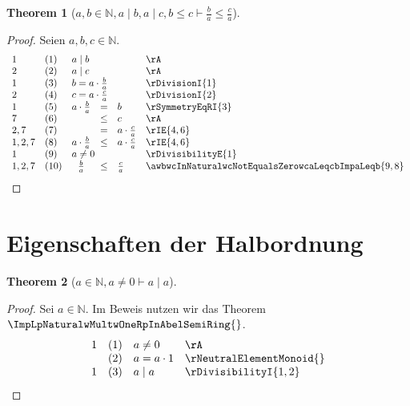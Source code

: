 \documentclass{book}
\theoremstyle{plain}
\newtheorem{theorem}{Theorem}
\theoremstyle{remark}
\theoremstyle{definition}
\begin{document}
\label{awbInNaturalwaMidbwaMidcwbLeqcImpLpbRpDurchLpaRpLeqLpcRpDurchLpaRp}
\begin{theorem}[\(a,b\in\mathbb{N}, a\mid b, a\mid c, b\leq c\vdash \frac{b}{a}\leq \frac{c}{a}\)]    
\end{theorem}
\begin{proof}
Seien \(a,b,c \in\mathbb{N}\).
    \[
	\begin{array}{llclll}
    1       &  (1)  & \multicolumn{3}{l}{a\mid b} & \rA \\
    2       &  (2)  & \multicolumn{3}{l}{a\mid c} & \rA \\
    1       &  (3)  & \multicolumn{3}{l}{b=a\cdot\frac{b}{a}} & \rDivisionI{1} \\
    2       &  (4)  & \multicolumn{3}{l}{c=a\cdot\frac{c}{a}} & \rDivisionI{2} \\
    1       &  (5)  & a\cdot \frac{b}{a}&=&b & \rSymmetryEqRI{3} \\
    7       &  (6)  & &\leq &c & \rA \\
    2,7     &  (7)  & &= &a\cdot\frac{c}{a} & \rIE{4,6} \\
    1,2,7   &  (8)  & a\cdot \frac{b}{a}&\leq  &a\cdot\frac{c}{a} & \rIE{4,6} \\
    1       &  (9)  & \multicolumn{3}{l}{a\neq 0} & \rDivisibilityE{1} \\
    1,2,7   &  (10)  & \frac{b}{a}&\leq  &\frac{c}{a} & \awbwcInNaturalwcNotEqualsZerowcaLeqcbImpaLeqb{9,8} \\
    \end{array}
	\]
\end{proof}

\section{Eigenschaften der Halbordnung}

\label{aInNaturalwaNotEqualsZeroImpaMidLbaRb}
\begin{theorem}[\(a\in\mathbb{N}, a\neq 0 \vdash a\mid{a}\)]
\end{theorem}
\begin{proof}
Sei \(a\in\mathbb{N}\).
Im Beweis nutzen wir das Theorem \(\ImpLpNaturalwMultwOneRpInAbelSemiRing{}\). 
    \[
	\begin{array}{llclll}
    1       &  (1)  & \multicolumn{3}{l}{a\neq 0} & \rA \\
            &  (2)  & \multicolumn{3}{l}{a=a\cdot 1} & \rNeutralElementMonoid{} \\
    1       &  (3)  & \multicolumn{3}{l}{a\mid a} & \rDivisibilityI{1,2} \\
    \end{array}
	\]
\end{proof}
\end{document}
